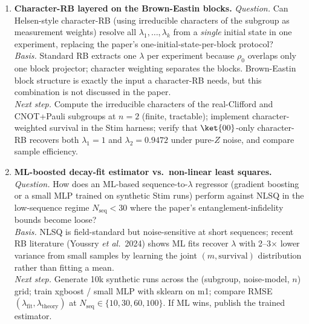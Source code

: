 \begin{enumerate}
\item \textbf{Character-RB layered on the Brown-Eastin blocks.}
\emph{Question.} Can Helsen-style character-RB (using irreducible
characters of the subgroup as measurement weights) resolve all
$\lambda_1,\ldots,\lambda_k$ from a \emph{single} initial state
in one experiment, replacing the paper's one-initial-state-per-block
protocol?\\
\emph{Basis.} Standard RB extracts one $\lambda$ per experiment because
$\rho_0$ overlaps only one block projector; character weighting separates
the blocks. Brown-Eastin block structure is exactly the input a
character-RB needs, but this combination is not discussed in the paper.\\
\emph{Next step.} Compute the irreducible characters of the real-Clifford
and CNOT+Pauli subgroups at $n=2$ (finite, tractable); implement
character-weighted survival in the Stim harness; verify that
$\ket{00}$-only character-RB recovers both $\lambda_1=1$ and
$\lambda_2=0.9472$ under pure-$Z$ noise, and compare sample efficiency.

\item \textbf{ML-boosted decay-fit estimator vs.\ non-linear least squares.}
\emph{Question.} How does an ML-based sequence-to-$\lambda$ regressor
(gradient boosting or a small MLP trained on synthetic Stim runs) perform
against NLSQ in the low-sequence regime $N_{\mathrm{seq}} < 30$ where
the paper's entanglement-infidelity bounds become loose?\\
\emph{Basis.} NLSQ is field-standard but noise-sensitive at short
sequences; recent RB literature (Youssry \emph{et al.}\ 2024) shows
ML fits recover $\lambda$ with 2--3$\times$ lower variance from small
samples by learning the joint $(m, \text{survival})$ distribution
rather than fitting a mean.\\
\emph{Next step.} Generate 10k synthetic runs across the
(subgroup, noise-model, $n$) grid; train xgboost / small MLP with
sklearn on m1; compare RMSE$(\lambda_{\mathrm{fit}}, \lambda_{\mathrm{theory}})$
at $N_{\mathrm{seq}} \in \{10, 30, 60, 100\}$. If ML wins, publish the
trained estimator.


\end{enumerate}
